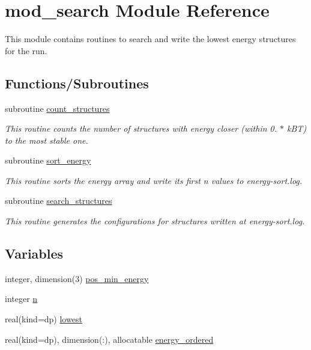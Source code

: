 \hypertarget{namespacemod__search}{}\section{mod\+\_\+search Module Reference}
\label{namespacemod__search}


This module contains routines to search and write the lowest energy structures for the run.  


\subsection*{Functions/\+Subroutines}
\begin{DoxyCompactItemize}
\item 
subroutine \hyperlink{namespacemod__search_a5026804a4e265b1a450eebc86cd81575}{count\+\_\+structures}
\begin{DoxyCompactList}\small\item\em This routine counts the number of structures with energy closer (within 0. $\ast$ k\+BT) to the most stable one. \end{DoxyCompactList}\item 
subroutine \hyperlink{namespacemod__search_a55e1f850472fe6cef190a6838ae61e51}{sort\+\_\+energy}
\begin{DoxyCompactList}\small\item\em This routine sorts the energy array and write its first n values to energy-\/sort.\+log. \end{DoxyCompactList}\item 
subroutine \hyperlink{namespacemod__search_ac11978e9ebdb6b101a09555f4742a4c9}{search\+\_\+structures}
\begin{DoxyCompactList}\small\item\em This routine generates the configurations for structures written at energy-\/sort.\+log. \end{DoxyCompactList}\end{DoxyCompactItemize}
\subsection*{Variables}
\begin{DoxyCompactItemize}
\item 
integer, dimension(3) \hyperlink{namespacemod__search_a018a3c64ea9e25b0dfc15ebe763920cf}{pos\+\_\+min\+\_\+energy}
\item 
integer \hyperlink{namespacemod__search_a0c7388c12d8e6a95b8c3f9fd86321687}{n}
\item 
real(kind=dp) \hyperlink{namespacemod__search_a014567a8f5474b311cedf2f9b1dbda1a}{lowest}
\item 
real(kind=dp), dimension(\+:), allocatable \hyperlink{namespacemod__search_a8ce72764a5658f7958ed5c473dd77706}{energy\+\_\+ordered}
\end{DoxyCompactItemize}


